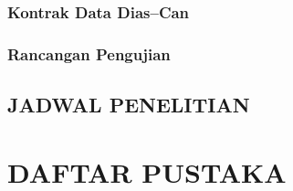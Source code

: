 \documentclass[12pt,a4paper,oneside,openany]{report}
\begin{document}
\subsection{Kontrak Data Dias--Can}
\label{subsec:kontrak-data}

\subsection{Rancangan Pengujian}
\label{subsec:rancangan-pengujian}

\section{JADWAL PENELITIAN}
\label{sec:jadwal-penelitian}
%

\chapter*{DAFTAR PUSTAKA}

%
\end{document}
